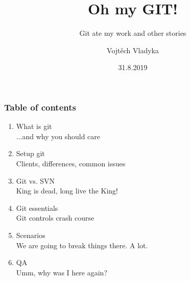 \documentclass{beamer}
\title{Oh my GIT!}
\subtitle{Git ate my work and other stories}
\author{Vojtěch Vladyka}
\date{31.8.2019}
\begin{document}
    \frame{\titlepage}
    \begin{frame}
       \frametitle{Table of contents}
       \begin{enumerate}
           \item What is git
           \\   \textcolor{solarizedRebase01}{\footnotesize\hspace{1em} ...and why you should care}	
           \item Setup git
           \\   \textcolor{solarizedRebase01}{\footnotesize\hspace{1em} Clients, differences, common issues}	
           \item Git vs. SVN
           \\   \textcolor{solarizedRebase01}{\footnotesize\hspace{1em} King is dead, long live the King!}	
           \item Git essentials
           \\   \textcolor{solarizedRebase01}{\footnotesize\hspace{1em} Git controls crash course}	
           \item Scenarios
           \\   \textcolor{solarizedRebase01}{\footnotesize\hspace{1em} We are going to break things there. A lot.}	
           \item QA
           \\   \textcolor{solarizedRebase01}{\footnotesize\hspace{1em} Umm, why was I here again?}
       \end{enumerate}
    \end{frame}
\end{document}
